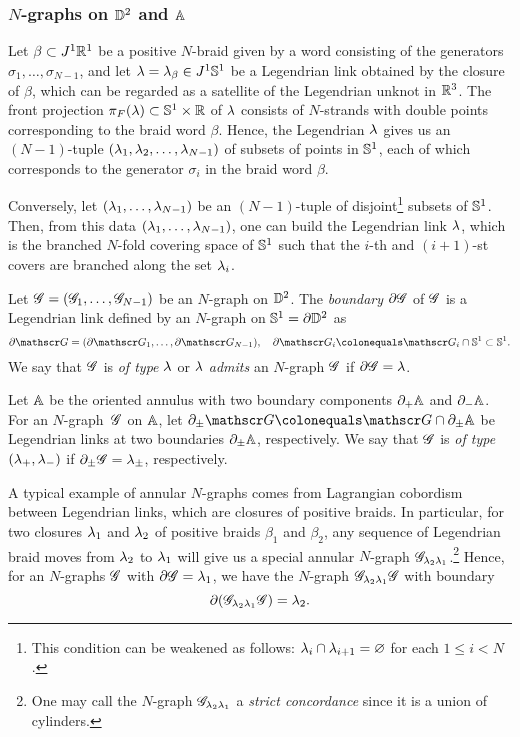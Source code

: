 \subsubsection{$N$-graphs on $\mathbb{D}^2$ and $\mathbb{A}$}\label{section:annular Ngraphs}
Let $\beta\subset J^1\mathbb{R}^1$ be a positive $N$-braid given by a word consisting of the generators $\sigma_1,\dots, \sigma_{N-1}$, and let $\lambda=\lambda_\beta\in J^1\mathbb{S}^1$ be a Legendrian link obtained by the closure of $\beta$, which can be regarded as a satellite of the Legendrian unknot in $\mathbb{R}^3$.
The front projection $\pi_F(\lambda)\subset \mathbb{S}^1\times \mathbb{R}$ of $\lambda$ consists of $N$-strands with double points corresponding to the braid word $\beta$.
Hence, the Legendrian $\lambda$ gives us an $(N-1)$-tuple $(\lambda_1, \lambda_2,\dots, \lambda_{N-1})$ of subsets of points in $\mathbb{S}^1$, each of which corresponds to the generator $\sigma_i$ in the braid word $\beta$.

Conversely, let $(\lambda_1,\dots, \lambda_{N-1})$ be an $(N-1)$-tuple of disjoint\footnote{This condition can be weakened as follows: $\lambda_i\cap \lambda_{i+1}=\varnothing$ for each $1\le i<N$.} subsets of $\mathbb{S}^1$.
Then, from this data $(\lambda_1,\dots,\lambda_{N-1})$, one can build the Legendrian link $\lambda$, which is the branched $N$-fold covering space of $\mathbb{S}^1$ such that the $i$-th and $(i+1)$-st covers are branched along the set $\lambda_i$.

Let $\mathscr{G}=(\mathscr{G}_1,\dots,\mathscr{G}_{N-1})$ be an $N$-graph on $\mathbb{D}^2$.
The \emph{boundary} $\partial\mathscr{G}$ of $\mathscr{G}$ is a Legendrian link defined by an $N$-graph on $\mathbb{S}^1=\partial\mathbb{D}^2$ as
\[
\boundary\ngraph=(\boundary\ngraph_1,\dots,\boundary\ngraph_{N-1}),\quad
\boundary\ngraph_i\colonequals \ngraph_i\cap \sphere^1\subset \sphere^1.
\]
We say that $\mathscr{G}$ is \emph{of type} $\lambda$ or $\lambda$ \emph{admits} an $N$-graph $\mathscr{G}$ if $\partial\mathscr{G}=\lambda$.

Let $\mathbb{A}$ be the oriented annulus with two boundary components $\partial_+\mathbb{A}$ and $\partial_-\mathbb{A}$.
For an $N$-graph~$\mathscr{G}$ on $\mathbb{A}$, let $\boundary_\pm\ngraph\colonequals\ngraph\cap\boundary_\pm\annulus$ be Legendrian links at two boundaries $\partial_\pm\mathbb{A}$, respectively.
We say that $\mathscr{G}$ is \emph{of type} $(\lambda_+, \lambda_-)$ if $\partial_\pm\mathscr{G}=\lambda_\pm$, respectively.

A typical example of annular $N$-graphs comes from Lagrangian cobordism between Legendrian links, which are closures of positive braids.
In particular, for two closures $\lambda_1$ and $\lambda_2$ of positive braids $\beta_1$ and $\beta_2$, any sequence of Legendrian braid moves from $\lambda_2$ to $\lambda_1$ will give us a special annular $N$-graph $\mathscr{G}_{\lambda_2\lambda_1}$.\footnote{One may call the $N$-graph $\mathscr{G}_{\lambda_2\lambda_1}$ a \emph{strict concordance} since it is a union of cylinders.}
Hence, for an $N$-graphs $\mathscr{G}$ with $\partial\mathscr{G}=\lambda_1$, we have the $N$-graph $\mathscr{G}_{\lambda_2\lambda_1}\mathscr{G}$ with boundary
\[
\partial(\mathscr{G}_{\lambda_2\lambda_1}\mathscr{G})=\lambda_2.
\]

